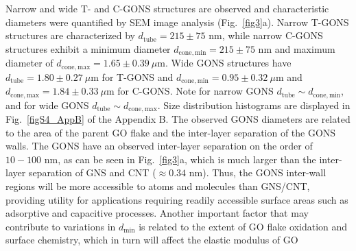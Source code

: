 Narrow and wide T- and C-GONS structures are observed and characteristic diameters were quantified by SEM image analysis (Fig.~\ref{fig3}a). Narrow T-GONS structures are characterized by $d_{\mathrm{tube}} = 215 \pm 75$ nm, while narrow C-GONS structures exhibit a minimum diameter $d_{\mathrm{cone,min}} = 215 \pm 75$ nm and maximum diameter of $d_{\mathrm{cone,max}} = 1.65 \pm 0.39\ \mu$m. Wide GONS structures have $d_{\mathrm{tube}} = 1.80 \pm 0.27\ \mu$m for T-GONS and $d_{\mathrm{cone,min}} = 0.95 \pm 0.32\ \mu$m and $d_{\mathrm{cone,max}} = 1.84 \pm 0.33\ \mu$m for C-GONS. Note for narrow GONS $d_{\mathrm{tube}} \sim d_{\mathrm{cone,min}}$, and for wide GONS $d_{\mathrm{tube}} \sim d_{\mathrm{cone,max}}$. Size distribution histograms are displayed in Fig.~\ref{figS4_AppB} of the Appendix B.  The observed GONS diameters are related to the area of the parent GO flake and the inter-layer separation of the GONS walls. The GONS have an observed inter-layer separation on the order of $10-100$ nm,\cite{Fan2015} as can be seen in Fig.~\ref{fig3}a, which is much larger than the inter-layer separation of GNS and CNT ($\approx0.34$ nm).\cite{Zhang2010} Thus, the GONS inter-wall regions will be more accessible to atoms and molecules than GNS/CNT, providing utility for applications requiring readily accessible surface areas such as adsorptive and capacitive processes.
Another important factor that may contribute to variations in $d_{\mathrm{min}}$ is related to the extent of GO flake oxidation and surface chemistry, which in turn will affect the elastic modulus of GO\cite{Liu2012}

